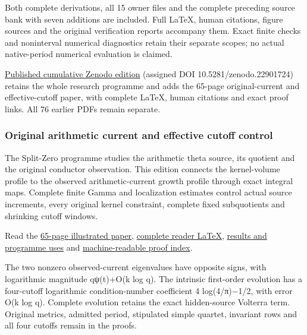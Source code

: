 \documentclass[
]{article}
\begin{document}
Both complete derivations, all 15 owner files and the complete preceding
source bank with seven additions are included. Full LaTeX, human
citations, figure sources and the original verification reports
accompany them. Exact finite checks and noninterval numerical
diagnostics retain their separate scopes; no actual native-period
numerical evaluation is claimed.

\href{https://zenodo.org/records/22901724}{Published cumulative Zenodo
edition} (assigned DOI 10.5281/zenodo.22901724) retains the whole
research programme and adds the 65-page original-current and
effective-cutoff paper, with complete LaTeX, human citations and exact
proof links. All 76 earlier PDFs remain separate.

\subsubsection{Original arithmetic current and effective cutoff
control}\label{original-arithmetic-current-and-effective-cutoff-control}

The Split-Zero programme studies the arithmetic theta source, its
quotient and the original conductor observation. This edition connects
the kernel-volume profile to the observed arithmetic-current growth
profile through exact integral maps. Complete finite Gamma and
localization estimates control actual source increments, every original
kernel constraint, complete fixed subquotients and shrinking cutoff
windows.

Read the
\href{https://github.com/KokunoYumeto/zeta-function-research-reader/blob/main/workbenches/splitzero-tandem/continuations/20260922-current-effective-cutoff/CURRENT_AND_CUTOFF_READER.pdf}{65-page
illustrated paper},
\href{https://github.com/KokunoYumeto/zeta-function-research-reader/blob/main/workbenches/splitzero-tandem/continuations/20260922-current-effective-cutoff/CURRENT_AND_CUTOFF_READER.tex}{complete
reader LaTeX},
\href{https://github.com/KokunoYumeto/zeta-function-research-reader/blob/main/workbenches/splitzero-tandem/continuations/20260922-current-effective-cutoff/RESULTS_20260922_026.md}{results
and programme uses} and
\href{https://github.com/KokunoYumeto/zeta-function-research-reader/blob/main/workbenches/splitzero-tandem/continuations/20260922-current-effective-cutoff/RESULT_INDEX.json}{machine-readable
proof index}.

The two nonzero observed-current eigenvalues have opposite signs, with
logarithmic magnitude qψ(t)+O(k log q). The intrinsic first-order
evolution has a four-cutoff logarithmic condition-number coefficient 4
log(4/π)−1/2, with error O(k log q). Complete evolution retains the
exact hidden-source Volterra term. Original metrics, admitted period,
stipulated simple quartet, invariant rows and all four cutoffs remain in
the proofs.
\end{document}
